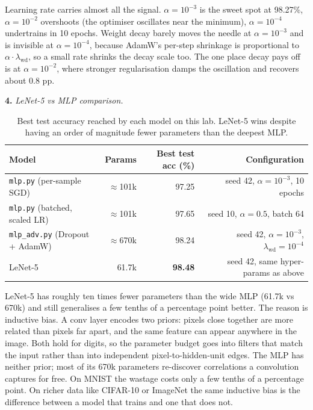 \documentclass[11pt,a4paper]{article}
\newcommand{\Qpart}[1]{\textbf{#1.}}
\begin{document}
Learning rate carries almost all the signal. $\alpha = 10^{-3}$ is the sweet spot at 98.27\%, $\alpha = 10^{-2}$ overshoots (the optimiser oscillates near the minimum), $\alpha = 10^{-4}$ undertrains in 10 epochs. Weight decay barely moves the needle at $\alpha = 10^{-3}$ and is invisible at $\alpha = 10^{-4}$, because AdamW's per-step shrinkage is proportional to $\alpha \cdot \lambda_{\text{wd}}$, so a small rate shrinks the decay scale too. The one place decay pays off is at $\alpha = 10^{-2}$, where stronger regularisation damps the oscillation and recovers about 0.8 pp.

\Qpart{4} \textit{LeNet-5 vs MLP comparison.}

\begin{table}[h]
\centering
\small
\begin{tabular}{lrrr}
\toprule
Model & Params & Best test acc (\%) & Configuration \\
\midrule
\texttt{mlp.py} (per-sample SGD)       & $\approx$101k & 97.25 & seed 42, $\alpha = 10^{-3}$, 10 epochs \\
\texttt{mlp.py} (batched, scaled LR)   & $\approx$101k & 97.65 & seed 10, $\alpha = 0.5$, batch 64 \\
\texttt{mlp\_adv.py} (Dropout + AdamW) & $\approx$670k & 98.24 & seed 42, $\alpha = 10^{-3}$, $\lambda_{\text{wd}} = 10^{-4}$ \\
LeNet-5                                & 61.7k & \textbf{98.48} & seed 42, same hyper-params as above \\
\bottomrule
\end{tabular}
\caption{Best test accuracy reached by each model on this lab. LeNet-5 wins despite having an order of magnitude fewer parameters than the deepest MLP.}
\end{table}

LeNet-5 has roughly ten times fewer parameters than the wide MLP (61.7k vs 670k) and still generalises a few tenths of a percentage point better. The reason is inductive bias. A conv layer encodes two priors: pixels close together are more related than pixels far apart, and the same feature can appear anywhere in the image. Both hold for digits, so the parameter budget goes into filters that match the input rather than into independent pixel-to-hidden-unit edges. The MLP has neither prior; most of its 670k parameters re-discover correlations a convolution captures for free. On MNIST the wastage costs only a few tenths of a percentage point. On richer data like CIFAR-10 or ImageNet the same inductive bias is the difference between a model that trains and one that does not.
\end{document}
